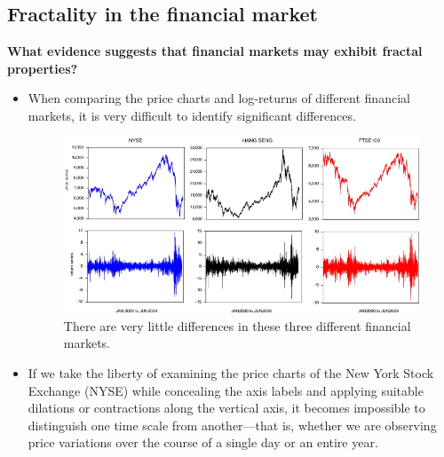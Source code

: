 \subsection{Fractality in the financial market}
\textbf{What evidence suggests that financial markets may exhibit fractal properties?}
\begin{itemize}
    \item When comparing the price charts and log-returns of different financial markets, it is very difficult to identify significant differences.
    \begin{figure} [H]
        \centering
        \includegraphics[width=1\linewidth]{img/fractal_1.png}
        \caption{There are very little differences in these three different financial markets.}
    \end{figure}
    \item If we take the liberty of examining the price charts of the New York Stock Exchange (NYSE) while concealing the axis labels and applying suitable dilations or contractions along the vertical axis, it becomes impossible to distinguish one time scale from another—that is, whether we are observing price variations over the course of a single day or an entire year.


\end{itemize}
